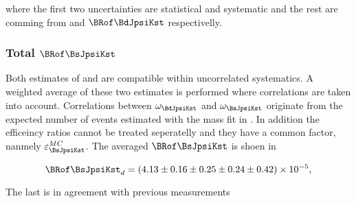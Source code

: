  \noindent where the first two uncertainties are statistical and systematic and the rest are comming from \fdfs and $\BRof\BdJpsiKst$ respectivelly.

\subsubsection{Total  $\BRof\BsJpsiKst$}
Both estimates of  and  are compatible within uncorrelated systematics. A weighted average of these two
estimates is performed where correlations are taken into account. Correlations between $\omega_{\BdJpsiKst}$ and $\omega_{\BsJpsiKst}$ originate from the
expected number of events estimated with the mass fit in . In addition the efficeincy ratios cannot be treated seperatelly
and they have a common factor, nanmely $\varepsilon_{\BsJpsiKst}^{MC}$. The averaged  $\BRof\BsJpsiKst$ is shoen in 

\begin{equation}
\BRof\BsJpsiKst_{d} = (4.13 \pm 0.16 \pm 0.25 \pm 0.24 \pm 0.42 )\times 10^{-5},
\label{Br_total}
\end{equation}

\noindent The last is in agreement with previous measurements \cite{LHCb-PAPER-2015-006}
